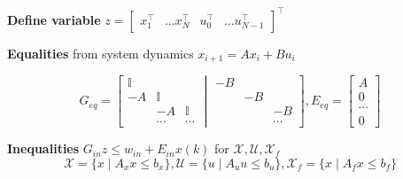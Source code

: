 \textbf{Define variable} $z =
	\begin{bmatrix}
		x_1^\top & \dots x_N^\top & u_0^\top & \dots u_{N-1}^\top
	\end{bmatrix}^\top$

\textbf{Equalities} from system dynamics
$x_{i+1} = Ax_i + Bu_i$

\[
	G_{eq} =
	\left[
		\begin{smallmatrix}
			\mathbb{I} & & \\
			-A & \mathbb{I} & \\
			& -A & \mathbb{I} \\
			&  \cdots & \cdots
		\end{smallmatrix}
		\middle|
		\begin{smallmatrix}
			-B & & \\
			& -B & \\
			& & -B \\
			& & \cdots
		\end{smallmatrix}
		\right],
	E_{eq} =
	\left[
		\begin{smallmatrix}
			A \\
			0 \\
			\cdots \\
			0
		\end{smallmatrix}
		\right]
\]

\textbf{Inequalities}
$G_{in}z \leq w_{in} + E_{in}x(k)$
for $\mathcal{X}, \mathcal{U}, \mathcal{X}_f$
\[
	\mathcal{X}   = \{x \mid A_x x \leq b_x\},
	\mathcal{U}   = \{u \mid A_u u \leq b_u\},
	\mathcal{X}_f = \{x \mid A_f x \leq b_f\}
\]

